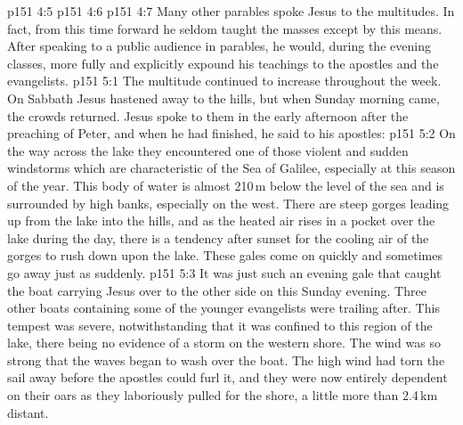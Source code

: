\vs p151 4:5 \pc {}
\vs p151 4:6 \pc {}
\vs p151 4:7 \pc Many other parables spoke Jesus to the multitudes. In fact, from this time forward he seldom taught the masses except by this means. After speaking to a public audience in parables, he would, during the evening classes, more fully and explicitly expound his teachings to the apostles and the evangelists.
\vs p151 5:1 The multitude continued to increase throughout the week. On Sabbath Jesus hastened away to the hills, but when Sunday morning came, the crowds returned. Jesus spoke to them in the early afternoon after the preaching of Peter, and when he had finished, he said to his apostles: 
\vs p151 5:2 On the way across the lake they encountered one of those violent and sudden windstorms which are characteristic of the Sea of Galilee, especially at this season of the year. This body of water is almost 210\,m below the level of the sea and is surrounded by high banks, especially on the west. There are steep gorges leading up from the lake into the hills, and as the heated air rises in a pocket over the lake during the day, there is a tendency after sunset for the cooling air of the gorges to rush down upon the lake. These gales come on quickly and sometimes go away just as suddenly.
\vs p151 5:3 It was just such an evening gale that caught the boat carrying Jesus over to the other side on this Sunday evening. Three other boats containing some of the younger evangelists were trailing after. This tempest was severe, notwithstanding that it was confined to this region of the lake, there being no evidence of a storm on the western shore. The wind was so strong that the waves began to wash over the boat. The high wind had torn the sail away before the apostles could furl it, and they were now entirely dependent on their oars as they laboriously pulled for the shore, a little more than 2.4\,km distant.
